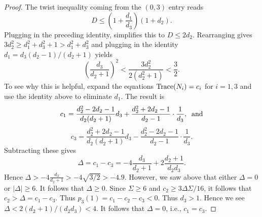 \documentclass[12pt,psamsfonts]{amsart}
\numberwithin{equation}{section}
\theoremstyle{definition}
\begin{document}
\begin{proof}
The twist inequality coming from the $(0,3)$ entry reads
$$D\le \left(1+\frac{d_1}{d_3}\right)(1+d_2).$$
Plugging in the preceding identity, simplifies this to $D\le 2
d_2$. Rearranging gives $3 d_2^2 \ge d_1^2 + d_3^2 + 1 > d_1^2 +
d_3^2$ and plugging in the identity $d_1=d_3 (d_2-1)/(d_2+1)$
yields
$$\left(\frac{d_3}{d_2+1}\right)^2 < \frac{3d_2^2}{2(d_2^2+1)}<\frac{3}{2}.$$
To see why this is helpful, expand the equations ${\rm
Trace}(N_i)=c_i$ for $i=1,3$ and use the identity above to
eliminate $d_1$. The result is
$$c_1=\frac{d_2^2-2d_2-1}{d_2(d_2+1)} d_3 +
\frac{d_2^2+2d_2-1}{d_2-1}\cdot \frac{1}{d_3},\;\; {\rm and}$$
$$c_3=\frac{d_2^2+2d_2-1}{d_2(d_2+1)} d_3 -
\frac{d_2^2-2d_2-1}{d_2-1}\cdot \frac{1}{d_3}.$$ Subtracting these
gives
$$\Delta=c_1-c_3=-4 \frac{d_3}{d_2+1} + 2 \frac{d_2+1}{d_2d_3}.$$
Hence $\Delta > -4 \frac{d_3}{d_2+1} > -4 {\sqrt {3/2}}>-4.9$.
However, we saw above that either $\Delta=0$ or $\vert \Delta\vert
\ge 6$. It follows that $\Delta\ge 0$. Since $\Sigma\ge 6$ and
$c_2\ge 3 \Delta\Sigma/16$, it follows that $c_2>\Delta=c_1-c_3$.
Thus $p_3(1)=c_1-c_2-c_3<0$. Thus $d_3>1$. Hence we see $\Delta <
2(d_2+1)/(d_2d_3)<4$. It follows that $\Delta=0$, i.e., $c_1=c_3$.


\end{proof}
\end{document}
